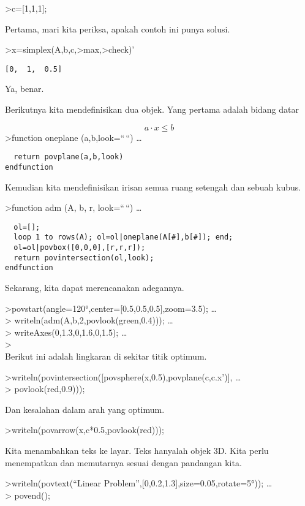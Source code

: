 \documentclass[
]{book}
\begin{document}
\textgreater c={[}1,1,1{]};

Pertama, mari kita periksa, apakah contoh ini punya solusi.

\textgreater x=simplex(A,b,c,\textgreater max,\textgreater check)'

\begin{verbatim}
[0,  1,  0.5]
\end{verbatim}

Ya, benar.

Berikutnya kita mendefinisikan dua objek. Yang pertama adalah bidang datar

\[a \cdot x \le b\]\textgreater function oneplane (a,b,look=``\,``) \ldots{}

\begin{verbatim}
  return povplane(a,b,look)
endfunction
\end{verbatim}

Kemudian kita mendefinisikan irisan semua ruang setengah dan sebuah kubus.

\textgreater function adm (A, b, r, look=``\,``) \ldots{}

\begin{verbatim}
  ol=[];
  loop 1 to rows(A); ol=ol|oneplane(A[#],b[#]); end;
  ol=ol|povbox([0,0,0],[r,r,r]);
  return povintersection(ol,look);
endfunction
\end{verbatim}

Sekarang, kita dapat merencanakan adegannya.

\textgreater povstart(angle=120°,center={[}0.5,0.5,0.5{]},zoom=3.5); \ldots{}\\
\textgreater{} writeln(adm(A,b,2,povlook(green,0.4))); \ldots{}\\
\textgreater{} writeAxes(0,1.3,0,1.6,0,1.5); \ldots{}\\
\textgreater{}\\
Berikut ini adalah lingkaran di sekitar titik optimum.

\textgreater writeln(povintersection({[}povsphere(x,0.5),povplane(c,c.x'){]}, \ldots{}\\
\textgreater{} povlook(red,0.9)));

Dan kesalahan dalam arah yang optimum.

\textgreater writeln(povarrow(x,c*0.5,povlook(red)));

Kita menambahkan teks ke layar. Teks hanyalah objek 3D. Kita perlu menempatkan dan memutarnya sesuai dengan pandangan kita.

\textgreater writeln(povtext(``Linear Problem'',{[}0,0.2,1.3{]},size=0.05,rotate=5°)); \ldots{}\\
\textgreater{} povend();
\end{document}
